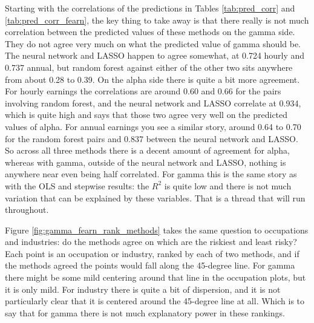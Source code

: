 \documentclass[12pt]{article}
\begin{document}
\begin{onehalfspace}
Starting with the correlations of the predictions in Tables \ref{tab:pred_corr} and \ref{tab:pred_corr_fearn}, the key thing to take away is that there really is not much correlation between the predicted values of these methods on the gamma side. They do not agree very much on what the predicted value of gamma should be. The neural network and LASSO happen to agree somewhat, at 0.724 hourly and 0.737 annual, but random forest against either of the other two sits anywhere from about 0.28 to 0.39. On the alpha side there is quite a bit more agreement. For hourly earnings the correlations are around 0.60 and 0.66 for the pairs involving random forest, and the neural network and LASSO correlate at 0.934, which is quite high and says that those two agree very well on the predicted values of alpha. For annual earnings you see a similar story, around 0.64 to 0.70 for the random forest pairs and 0.837 between the neural network and LASSO. So across all three methods there is a decent amount of agreement for alpha, whereas with gamma, outside of the neural network and LASSO, nothing is anywhere near even being half correlated. For gamma this is the same story as with the OLS and stepwise results: the $R^2$ is quite low and there is not much variation that can be explained by these variables. That is a thread that will run throughout.

\begin{table}[H]
    \centering
    \caption{Correlation of ML Predictions, Hourly Earnings}
    \label{tab:pred_corr}
    
\end{table}

\begin{table}[H]
    \centering
    \caption{Correlation of ML Predictions, Annual Earnings}
    \label{tab:pred_corr_fearn}
    
\end{table}


Figure \ref{fig:gamma_fearn_rank_methods} takes the same question to occupations and industries: do the methods agree on which are the riskiest and least risky? Each point is an occupation or industry, ranked by each of two methods, and if the methods agreed the points would fall along the 45-degree line. For gamma there might be some mild centering around that line in the occupation plots, but it is only mild. For industry there is quite a bit of dispersion, and it is not particularly clear that it is centered around the 45-degree line at all. Which is to say that for gamma there is not much explanatory power in these rankings.




\end{onehalfspace}
\end{document}
